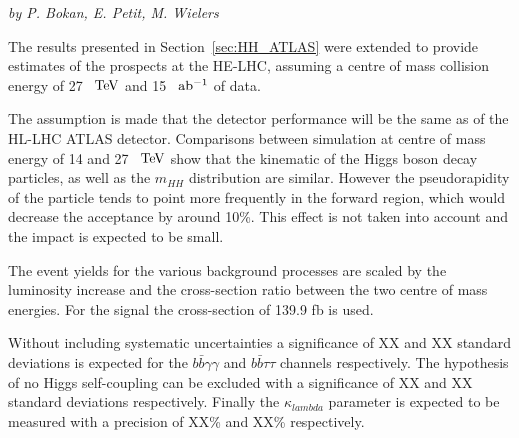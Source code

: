 \begin{center}
\textit{by P. Bokan, E. Petit, M. Wielers}
\end{center}

The results presented in Section~\ref{sec:HH_ATLAS} were extended to provide estimates of the prospects at the HE-LHC, assuming a centre of mass collision energy of 27~$~\text{TeV}$ and 15~$\rm~ab^{-1}$ of data.

The assumption is made that the detector performance will be the same as of the HL-LHC ATLAS detector. Comparisons between simulation at centre of mass energy of 14 and 27~$~\text{TeV}$ show that the kinematic of the Higgs boson decay particles, as well as the $m_{HH}$ distribution are similar. However the pseudorapidity of the particle tends to point more frequently in the forward region, which would decrease the acceptance by around 10\%. This effect is not taken into account and the impact is expected to be small.

The event yields for the various background processes are scaled by the luminosity increase and the cross-section ratio between the two centre of mass energies. For the signal the cross-section of 139.9 fb is used.

Without including systematic uncertainties a significance of XX and XX standard deviations is expected for the $b\bar{b}\gamma\gamma$ and $b\bar{b}\tau\tau$ channels respectively.
The hypothesis of no Higgs self-coupling can be excluded with a significance of XX and XX standard deviations respectively. Finally the $\kappa_{lambda}$ parameter is expected to be measured with a precision of XX\% and XX\% respectively.